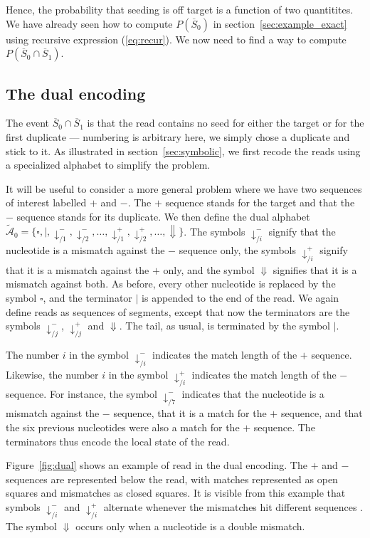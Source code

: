 \documentclass{article}
\begin{document}
Hence, the probability that seeding is off target is a function of two
quantitites. We have already seen how to compute $P(\overline{S}_0)$ in
section~\ref{sec:example_exact} using recursive expression
(\ref{eq:recur}). We now need to find a way to compute $P(\overline{S}_0
\cap \overline{S}_1)$.

\subsection{The dual encoding}
\label{sec:dual}

The event $\overline{S}_0 \cap \overline{S}_1$ is that the read contains
no seed for either the target or for the first duplicate --- numbering is
arbitrary here, we simply chose a duplicate and stick to it. As
illustrated in section~\ref{sec:symbolic}, we first recode the reads using
a specialized alphabet to simplify the problem.

It will be useful to consider a more general problem where we
have two sequences of interest labelled $+$ and $-$. The $+$ sequence
stands for the target and that the $-$ sequence stands for its duplicate.
We then define the dual alphabet $\tilde{\mathcal{A}}_0 = \{\square, |,
\downarrow_{/1}^-, \downarrow_{/2}^-, \ldots, \downarrow_{/1}^+,
\downarrow_{/2}^+, \ldots, \Downarrow\}$. The symbols $\downarrow_{/i}^-$
signify that the nucleotide is a mismatch against the $-$ sequence only,
the symbols $\downarrow_{/i}^+$ signify that it is a mismatch against the
$+$ only, and the symbol $\Downarrow$ signifies that it is a mismatch
against both. As before, every other nucleotide is replaced by the symbol
$\square$, and the terminator $|$ is appended to the end of the read. We
again define reads as sequences of segments, except that now the
terminators are the symbols $\downarrow_{/j}^-$, $\downarrow_{/j}^+$ and
$\Downarrow$. The tail, as usual, is terminated by the symbol $|$.

The number $i$ in the symbol $\downarrow_{/i}^-$ indicates the match
length of the $+$ sequence. Likewise, the number $i$ in the symbol
$\downarrow_{/i}^+$ indicates the match length of the $-$ sequence. For
instance, the symbol $\downarrow_{/7}^-$ indicates that the nucleotide is a
mismatch against the $-$ sequence, that it is a match for the $+$
sequence, and that the six previous nucleotides were also a match for the
$+$ sequence. The terminators thus encode the local state of the read.

Figure~\ref{fig:dual} shows an example of read in the dual encoding. The $+$
and $-$ sequences are represented below the read, with matches represented
as open squares and mismatches as closed squares. It is visible from this
example that symbols $\downarrow^-_{/i}$ and $\downarrow^+_{/i}$ alternate
whenever the mismatches hit different sequences . The symbol $\Downarrow$
occurs only when a nucleotide is a double mismatch.
\end{document}
